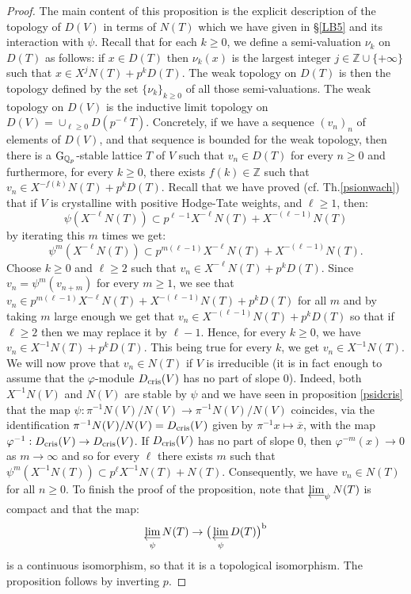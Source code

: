 \documentclass[11pt]{amsart}
\def\limproj{\mathop{\oalign{{\rm lim}\cr 
\hidewidth$\longleftarrow$\hidewidth\cr}}}
\def\Q{{\mathbb Q}_p}
\def\g{{\rm G}_{\Q}}
\def\dcris{D_{\rm cris}}
\begin{document}
\begin{proof} 
The main content of this proposition is the  
explicit description of the 
topology of $D(V)$ in terms of $N(T)$ which we have given in 
\S\ref{LB5} and its interaction with $\psi$.  
Recall that for each $k \geq 0$, we define a semi-valuation 
$\nu_k$ on $D(T)$ as follows: if $x \in D(T)$ then $\nu_k(x)$ is 
the largest integer $j \in \mathbb{Z} \cup \{ + \infty\}$  
such that $x \in X^j N(T) + p^k D(T)$. The weak topology on $D(T)$ is 
then the topology defined by the set $\{\nu_k\}_{k \geq 0}$ of all 
those semi-valuations. 
The weak topology on $D(V)$ is the inductive 
limit topology on $D(V) = \cup_{\ell \geq 0} D(p^{-\ell}T)$.  
Concretely, if we  
have a sequence $(v_n)_n$ of elements of $D(V)$, and 
that sequence is bounded for the weak topology, then there is a 
$\g$-stable lattice $T$ of $V$ such that $v_n \in D(T)$ for every $n \geq 
0$ and furthermore, for every $k \geq 0$, there exists $f(k) \in 
\mathbb{Z}$ such that $v_n \in X^{-f(k)} N(T) + p^k D(T)$.  
Recall that we have proved (cf. Th.\ref{psionwach}) 
that if $V$ is crystalline with 
positive Hodge-Tate weights, and $\ell \geq 1$, then: 
$$\psi(X^{-\ell} N(T)) \subset p^{\ell-1} X^{-\ell} N(T) + X^{-(\ell-1)} N(T)$$ 
by iterating this $m$ times we get:  
$$\psi^m(X^{-\ell} N(T)) \subset p^{m(\ell-1)} X^{-\ell} N(T) + X^{-(\ell-1)} N(T).$$ 
Choose $k \geq 0$ and $\ell \geq 2$ such that  
$v_n \in X^{-\ell} N(T) + p^k D(T)$. Since $v_n = \psi^m  
(v_{n+m})$ for every $m \geq 1$, we see that $v_n \in p^{m(\ell-1)} X^{-\ell} N(T) +  
X^{-(\ell-1)} N(T) + p^k D(T)$ for all $m$ and by taking $m$ large 
enough we get that $v_n \in X^{-(\ell-1)} N(T) + p^k D(T)$ so that if  
$\ell \geq 2$ then we may replace it by $\ell-1$. 
Hence, for every $k \geq 0$, we have $v_n \in X^{-1} N(T) + p^k 
D(T)$. This being true for every $k$, we get $v_n \in X^{-1}N(T)$.  
We will now prove that $v_n \in N(T)$ if $V$ is irreducible (it is 
in fact enough to assume that the $\varphi$-module $\dcris(V)$  
has no part of slope $0$). Indeed, both  
$X^{-1}N(V)$ and $N(V)$ are stable by $\psi$ 
and we have seen in proposition \ref{psidcris} 
that the map $\psi : \pi^{-1} 
N(V) / N(V) \rightarrow  \pi^{-1} N(V) / N(V)$ coincides, via the 
identification $\pi^{-1} N(V) / N(V) = \dcris(V)$ given by 
$\pi^{-1}x \mapsto \overline{x}$, with the map $\varphi^{-1} : 
\dcris(V) \rightarrow \dcris(V)$. If $\dcris(V)$ has no part of 
slope $0$, then $\varphi^{-m}(x) \rightarrow 0$ as $m \rightarrow \infty$ 
and so for every $\ell$ there exists $m$ such that 
$\psi^m(X^{-1}N(T)) \subset p^{\ell}X^{-1}N(T) + N(T)$. Consequently, 
we have  $v_n \in N(T)$ for all $n \geq 0$. To finish the proof  
of the proposition, note that $\limproj_{\psi}N(T)$ is compact and that the map:  
$$\limproj_{\psi}N(T)\rightarrow \big(\limproj_{\psi}D(T)\big)^{\rm b}$$ 
is a continuous isomorphism, so that it is a topological isomorphism.  
The proposition follows by inverting $p$. 
\end{proof} 
 
\end{document}
